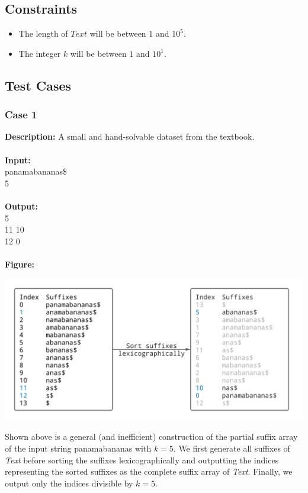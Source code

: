\documentclass{article}
\newcommand{\code}[1]{{\fontfamily{pcr}\selectfont #1}}
\begin{document}
\subsection*{Constraints}
\begin{itemize}
    \item The length of $Text$ will be between $1$ and $10^5$.
    \item The integer $k$ will be between $1$ and $10^1$.
\end{itemize}
\pagebreak

\subsection*{Test Cases}
\subsubsection*{Case 1}
\hline \vspace{5}
\textbf{Description:} A small and hand-solvable dataset from the textbook.\\ \\
\noindent \textbf{Input:}\\
\code{panamabananas\$\\ 5}\\ \\
\noindent \textbf{Output:}\\
\code{1 5\\ 11 10\\ 12 0}\\ \\
\noindent \textbf{Figure:}
\begin{center}
    \includegraphics[scale=0.16]{9Q.png}
\end{center}
\noindent Shown above is a general (and inefficient) construction of the partial suffix array of the input string \code{panamabananas} with $k=5$. We first generate all suffixes of \emph{Text} before sorting the suffixes lexicographically and outputting the indices representing the sorted suffixes as the complete suffix array of \emph{Text}. Finally, we output only the indices divisible by $k=5$.
\pagebreak
\end{document}
